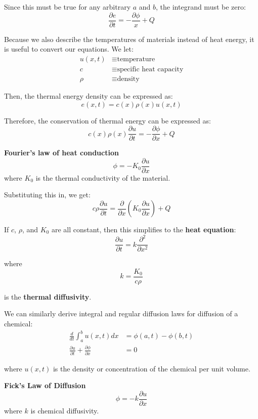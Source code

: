 \documentclass{article}
\begin{document}
Since this must be true for any arbitrary \(a\) and \(b\), the integrand must be zero:
\[
    \frac{\partial e}{\partial t}=-\frac{\partial \phi}{x}+Q
\]

Because we also describe the temperatures of materials instead of heat energy, it is useful to convert our equations. We let:
\begin{align*}
    u(x, t)&\equiv\text{temperature} \\
    c&\equiv\text{specific heat capacity} \\
    \rho&\equiv\text{density}
\end{align*}

Then, the thermal energy density can be expressed as:
\[
    e(x, t)=c(x)\rho(x)u(x,t)
\]

Therefore, the conservation of thermal energy can be expressed as:
\[
    c(x)\rho(x)\frac{\partial u}{\partial t}=-\frac{\partial \phi}{\partial x}+Q
\]

\begin{law}{\textbf{Fourier's law of heat conduction}}
    \[
        \phi=-K_0\frac{\partial u}{\partial x}
    \]
    where \(K_0\) is the thermal conductivity of the material. 
\end{law}

Substituting this in, we get:
\[
    c\rho\frac{\partial u}{\partial t}=\frac{\partial}{\partial x}(K_0\frac{\partial u}{\partial x})+Q
\]

If \(c\), \(\rho\), and \(K_0\) are all constant, then this simplifies to the \textbf{heat equation}:
\[
    \frac{\partial u}{\partial t}=k\frac{\partial^2}{\partial x^2}
\]

where
\[
    k=\frac{K_0}{c\rho}
\]

is the \textbf{thermal diffusivity}.

We can similarly derive integral and regular diffusion laws for diffusion of a chemical:
\begin{align*}
    \frac{d}{dt}\int_a^b u(x,t)dx&=\phi (a,t)-\phi (b,t) \\
    \frac{\partial u}{\partial t}+\frac{\partial \phi }{\partial x}&=0
\end{align*}

where \(u(x,t)\) is the density or concentration of the chemical per unit volume.

\begin{law}{\textbf{Fick's Law of Diffusion}}
    \[
        \phi =-k\frac{\partial u}{\partial x}
    \]
    where \(k\) is chemical diffusivity.
\end{law} 
\end{document}
